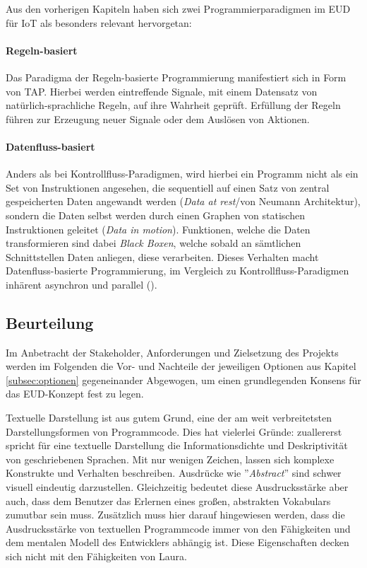 Aus den vorherigen Kapiteln haben sich zwei Programmierparadigmen im \ac{EUD} für \ac{IoT} als besonders relevant hervorgetan:

\paragraph{Regeln-basiert} Das Paradigma der Regeln-basierte Programmierung manifestiert sich in Form von \ac{TAP}. Hierbei werden eintreffende Signale, mit einem Datensatz von natürlich-sprachliche Regeln, auf ihre Wahrheit geprüft. Erfüllung der Regeln führen zur Erzeugung neuer Signale oder dem Auslösen von Aktionen. 
\paragraph{Datenfluss-basiert} Anders als bei Kontrollfluss-Paradigmen, wird hierbei ein Programm nicht als ein Set von Instruktionen angesehen, die sequentiell auf einen Satz von zentral gespeicherten Daten angewandt werden (\textit{Data at rest}/von Neumann Architektur), sondern die Daten selbst werden durch einen Graphen von statischen Instruktionen geleitet (\textit{Data in motion}). Funktionen, welche die Daten transformieren sind dabei \textit{Black Boxen}, welche sobald an sämtlichen Schnittstellen Daten anliegen, diese verarbeiten. Dieses Verhalten macht Datenfluss-basierte Programmierung, im Vergleich zu Kontrollfluss-Paradigmen inhärent asynchron und parallel (\cite{johnston2004advances}).

\subsection{Beurteilung}
Im Anbetracht der Stakeholder, Anforderungen und Zielsetzung des Projekts werden im Folgenden die Vor- und Nachteile der jeweiligen Optionen aus Kapitel \ref{subsec:optionen} gegeneinander Abgewogen, um einen grundlegenden Konsens für das \ac{EUD}-Konzept fest zu legen.

Textuelle Darstellung ist aus gutem Grund, eine der am weit verbreitetsten Darstellungsformen von Programmcode. Dies hat vielerlei Gründe: zuallererst spricht für eine textuelle Darstellung die Informationsdichte und Deskriptivität von geschriebenen Sprachen. Mit nur wenigen Zeichen, lassen sich komplexe Konstrukte und Verhalten beschreiben. Ausdrücke wie ''\textit{Abstract}'' sind schwer visuell eindeutig darzustellen.  Gleichzeitig bedeutet diese Ausdrucksstärke aber auch, dass dem Benutzer das Erlernen eines großen, abstrakten Vokabulars zumutbar sein muss. Zusätzlich muss hier darauf hingewiesen werden, dass die Ausdrucksstärke von textuellen Programmcode immer von den Fähigkeiten und dem mentalen Modell des Entwicklers abhängig ist. Diese Eigenschaften decken sich nicht mit den Fähigkeiten von Laura.


